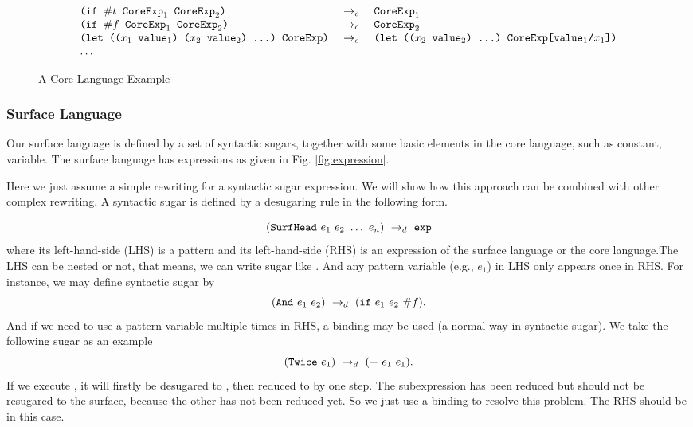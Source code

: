 \begin{figure*}[thb]
\begin{centering}
{\[{\begin{array}{lcl}
		\texttt{(if~$\#t$~$\mbox{\tt CoreExp}_1$~$\mbox{\tt CoreExp}_2$)}&~\rightarrow_c~& \texttt{$\mbox{\tt CoreExp}_1$}\\
		\texttt{(if~$\#f$~$\mbox{\tt CoreExp}_1$~$\mbox{\tt CoreExp}_2$)}&~\rightarrow_c~& \texttt{$\mbox{\tt CoreExp}_2$}\\
		\texttt{(let~(($x_1$~$\mbox{\tt value}_1$)~($x_2$~$\mbox{\tt value}_2$)~...)~CoreExp)}&~\rightarrow_c~&\texttt{(let~(($x_2$~$\mbox{\tt value}_2$)~...)~CoreExp[$\mbox{\tt value}_1$/$x_1$])}\\
		\ldots&&
		\end{array}
}
\]
}



\end{centering}
\caption{A Core Language Example}
\label{fig:core}
\end{figure*}




\subsubsection{Surface Language}

Our surface language is defined by a set of syntactic sugars, together with some basic elements in the core language, such as constant, variable. The surface language has expressions as given in Fig.  \ref{fig:expression}.

Here we just assume a simple rewriting for a syntactic sugar expression. We will show how this approach can be combined with other complex rewriting. A syntactic sugar is defined by a desugaring rule in the following form.

\[
(\mbox{\tt SurfHead}~e_1~e_2~\ldots~e_n) ~\rightarrow_d~ \mbox{\tt exp}
\]
where its left-hand-side (LHS) is a pattern and its left-hand-side (RHS) is an expression of the surface language or the core language.The LHS can be nested or not, that means, we can write sugar like . And any pattern variable (e.g., $e_1$) in LHS only appears once in RHS. For instance, we may define syntactic sugar  by
\[
(\mbox{\tt And}~e_1~e_2) ~\rightarrow_d~ (\mbox{\tt if}~e_1~e_2~\#f).
\]
And if we need to use a pattern variable multiple times in RHS, a  binding may be used (a normal way in syntactic sugar). We take the following sugar as an example
\[
(\mbox{\tt Twice}~e_1) ~\rightarrow_d~ (+~e_1~e_1).
\]
If we execute , it will firstly be desugared to , then reduced to  by one step. The subexpression  has been reduced but should not be resugared to the surface, because the other  has not been reduced yet.
So we just use a  binding to resolve this problem. The RHS should be  in this case.


